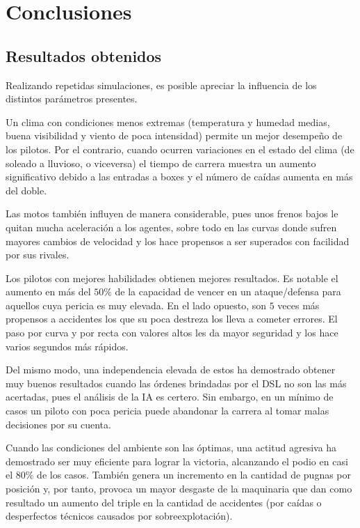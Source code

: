 \documentclass[12pt, letterpaper,spanish]{article}
\theoremstyle{definition}
\theoremstyle{remark}
\begin{document}
\newpage

\section{Conclusiones}

	\subsection{Resultados obtenidos}
	Realizando repetidas simulaciones, es posible apreciar la influencia de los distintos parámetros presentes.

	Un clima con condiciones menos extremas (temperatura y humedad medias, buena visibilidad y viento de poca intensidad) permite un mejor desempeño de los pilotos. Por el contrario, cuando ocurren variaciones en el estado del clima (de soleado a lluvioso, o viceversa) el tiempo de carrera muestra un aumento significativo debido a las entradas a boxes y el número de caídas aumenta en más del doble.

	Las motos también influyen de manera considerable, pues unos frenos bajos le quitan mucha aceleración a los agentes, sobre todo en las curvas donde sufren mayores cambios de velocidad y los hace propensos a ser superados con facilidad por sus rivales.

	Los pilotos con mejores habilidades obtienen mejores resultados. Es notable el aumento en más del $50\%$ de la capacidad de vencer en un ataque/defensa para aquellos cuya pericia es muy elevada. En el lado opuesto, son $5$ veces más propensos a accidentes los que su poca destreza los lleva a cometer errores. El paso por curva y por recta con valores altos les da mayor seguridad y los hace varios segundos más rápidos.

	Del mismo modo, una independencia elevada de estos ha demostrado obtener muy buenos resultados cuando las órdenes brindadas por el DSL no son las más acertadas, pues el análisis de la IA es certero. Sin embargo, en un mínimo de casos un piloto con poca pericia puede abandonar la carrera al tomar malas decisiones por su cuenta.

	Cuando las condiciones del ambiente son las óptimas, una actitud agresiva ha demostrado ser muy eficiente para lograr la victoria, alcanzando el podio en casi el $80\%$ de los casos. También genera un incremento en la cantidad de pugnas por posición y, por tanto, provoca un mayor desgaste de la maquinaria que dan como resultado un aumento del triple en la cantidad de accidentes (por caídas o desperfectos técnicos causados por sobreexplotación). 
\end{document}
